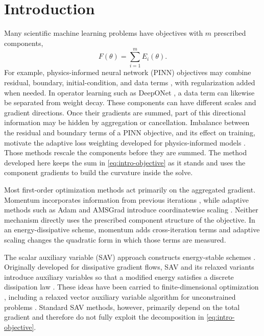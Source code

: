\section{Introduction}
\label{sec:introduction}

Many scientific machine learning problems have objectives with \(m\) prescribed
components,
\begin{equation}
F(\theta)=\sum_{i=1}^{m}E_i(\theta).
\label{eq:intro-objective}
\end{equation}
For example, physics-informed neural network (PINN) objectives may combine
residual, boundary, initial-condition, and data terms
\cite{raissi2019pinn,karniadakis2021physics}, with regularization added when
needed. In operator learning such as DeepONet \cite{lu2021deeponet} , a data term can likewise be separated from
weight decay. These components can have different scales and gradient
directions. Once their gradients are summed, part of this directional
information may be hidden by aggregation or cancellation. Imbalance between
the residual and boundary terms of a PINN objective, and its effect on
training, motivate the adaptive loss weighting developed for physics-informed
models \cite{wang2021gradientpathologies,wang2022pinnntk,mcclenny2023selfadaptive}.
Those methods rescale the components before they are summed. The method
developed here keeps the sum in \cref{eq:intro-objective} as it stands and
uses the component gradients to build the curvature inside the solve.

Most first-order optimization methods act primarily on the aggregated
gradient. Momentum incorporates information from previous iterations
\cite{polyak1964}, while adaptive methods such as Adam and AMSGrad introduce
coordinatewise scaling \cite{kingma2015adam,reddi2018amsgrad}. Neither
mechanism directly uses the prescribed component structure of the objective.
In an energy-dissipative scheme, momentum adds cross-iteration terms and
adaptive scaling changes the quadratic form in which those terms are measured.

The scalar auxiliary variable (SAV) approach constructs energy-stable schemes
\cite{shen2018sav,shen2019savreview}. Originally developed for dissipative
gradient flows, SAV and its relaxed variants introduce auxiliary variables so
that a modified energy satisfies a discrete dissipation law
\cite{jiang2022rsav,zhang2022gsavrelax}. These ideas have been carried to
finite-dimensional optimization \cite{liu2022,liu2023savopt}, including a
relaxed vector auxiliary variable algorithm for unconstrained problems
\cite{zhang2025rvsavopt, ZHANGop1, ZHANGop2}. Standard SAV methods,
however, primarily depend on the total gradient and therefore do not fully
exploit the decomposition in \cref{eq:intro-objective}.

